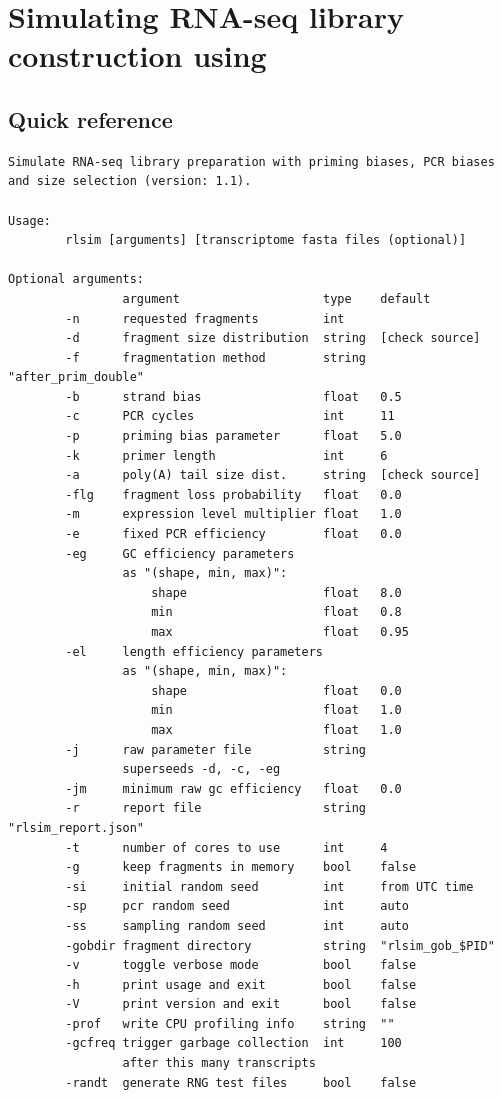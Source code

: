 \section{Simulating RNA-seq library construction using \rlsim}

\subsection{Quick reference}
\label{ss:qrlsim}

\begin{verbatim}
Simulate RNA-seq library preparation with priming biases, PCR biases and size selection (version: 1.1).

Usage:
        rlsim [arguments] [transcriptome fasta files (optional)]

Optional arguments:
                argument                    type    default  
        -n      requested fragments         int     
        -d      fragment size distribution  string  [check source]
        -f      fragmentation method        string  "after_prim_double"
        -b      strand bias                 float   0.5
        -c      PCR cycles                  int     11
        -p      priming bias parameter      float   5.0
        -k      primer length               int     6
        -a      poly(A) tail size dist.     string  [check source]
        -flg    fragment loss probability   float   0.0
        -m      expression level multiplier float   1.0
        -e      fixed PCR efficiency        float   0.0
        -eg     GC efficiency parameters 
                as "(shape, min, max)":
                    shape                   float   8.0
                    min                     float   0.8
                    max                     float   0.95
        -el     length efficiency parameters 
                as "(shape, min, max)":
                    shape                   float   0.0
                    min                     float   1.0
                    max                     float   1.0
        -j      raw parameter file          string  
                superseeds -d, -c, -eg
        -jm     minimum raw gc efficiency   float   0.0
        -r      report file                 string  "rlsim_report.json"
        -t      number of cores to use      int     4
        -g      keep fragments in memory    bool    false
        -si     initial random seed         int     from UTC time
        -sp     pcr random seed             int     auto
        -ss     sampling random seed        int     auto
        -gobdir fragment directory          string  "rlsim_gob_$PID"
        -v      toggle verbose mode         bool    false
        -h      print usage and exit        bool    false
        -V      print version and exit      bool    false
        -prof   write CPU profiling info    string  ""
        -gcfreq trigger garbage collection  int     100
                after this many transcripts
        -randt  generate RNG test files     bool    false


\end{verbatim}
